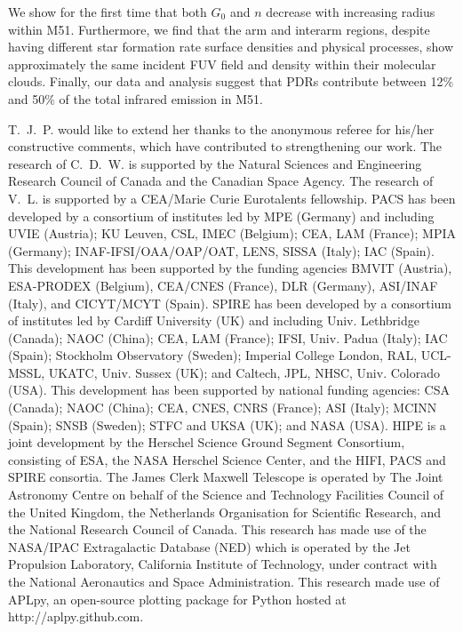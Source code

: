 \documentclass[preprint2]{aastex}
\begin{document}
We show for the first time that both $G_{0}$ and $n$ decrease with increasing radius within M51.  Furthermore, we find that the arm and interarm regions, despite having different star formation rate surface densities and physical processes, show approximately the same incident FUV field and density within their molecular clouds.  Finally, our data and analysis suggest that PDRs contribute between 12\% and 50\% of the total infrared emission in M51.


\acknowledgments
T.~J.~P. would like to extend her thanks to the anonymous referee for his/her constructive comments, which have contributed to strengthening our work.  The research of C.~D.~W. is supported by the Natural Sciences and Engineering Research Council of Canada and the Canadian Space Agency.  The research of V.~L. is supported by a CEA/Marie Curie Eurotalents fellowship.  PACS has been developed by a consortium of institutes led by MPE (Germany) and including UVIE (Austria); KU Leuven, CSL, IMEC (Belgium); CEA, LAM (France); MPIA (Germany); INAF-IFSI/OAA/OAP/OAT, LENS, SISSA (Italy); IAC (Spain). This development has been supported by the funding agencies BMVIT (Austria), ESA-PRODEX (Belgium), CEA/CNES (France), DLR (Germany), ASI/INAF (Italy), and CICYT/MCYT (Spain).  SPIRE has been developed by a consortium of institutes led by Cardiff University (UK) and including Univ. Lethbridge (Canada); NAOC (China); CEA, LAM (France); IFSI, Univ. Padua (Italy); IAC (Spain); Stockholm Observatory (Sweden); Imperial College London, RAL, UCL-MSSL, UKATC, Univ. Sussex (UK); and Caltech, JPL, NHSC, Univ. Colorado (USA). This development has been supported by national funding agencies: CSA (Canada); NAOC (China); CEA, CNES, CNRS (France); ASI (Italy); MCINN (Spain); SNSB (Sweden); STFC and UKSA (UK); and NASA (USA).  HIPE is a joint development by the Herschel Science Ground Segment Consortium, consisting of ESA, the NASA Herschel Science Center, and the HIFI, PACS and SPIRE consortia.  The James Clerk Maxwell Telescope is operated by The Joint Astronomy Centre on behalf of the Science and Technology Facilities Council of the United Kingdom, the Netherlands Organisation for Scientific Research, and the National Research Council of Canada. This research has made use of the NASA/IPAC Extragalactic Database (NED) which is operated by the Jet Propulsion Laboratory, California Institute of Technology, under contract with the National Aeronautics and Space Administration.  This research made use of APLpy, an open-source plotting package for Python hosted at http://aplpy.github.com.
\end{document}
